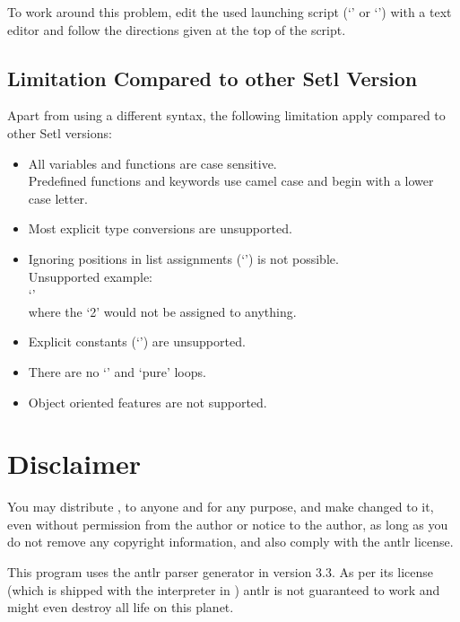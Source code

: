 To work around this problem, edit the used launching script (`' or `') with a text editor and follow the directions given at the top of the script.

\subsection{Limitation Compared to other Setl Version}

Apart from using a different syntax, the following limitation apply compared to other Setl versions:

\begin{itemize}
	\item All variables and functions are case sensitive.\\
        Predefined functions and keywords use camel case and begin with a lower case letter.
    \item Most explicit type conversions are unsupported.
    \item Ignoring positions in list assignments (`\command{-}') is not possible.\\
        Unsupported example:\\
        `\command{[x,-,y] := [1,2,3];}'\\
        where the `2' would not be assigned to anything.
    \item Explicit constants (`') are unsupported.
    \item There are no `' and `pure' loops.
    \item Object oriented features are not supported.
\end{itemize}

%


\section{Disclaimer}
You may distribute \setlX{}, to anyone and for any purpose, and make changed to it, even without permission from the author or notice to the author, as long as you do not remove any copyright information, and also comply with the antlr license.

This program uses the antlr parser generator in version 3.3. As per its license (which is shipped with the interpreter in ) antlr is not guaranteed to work and might even destroy all life on this planet.


